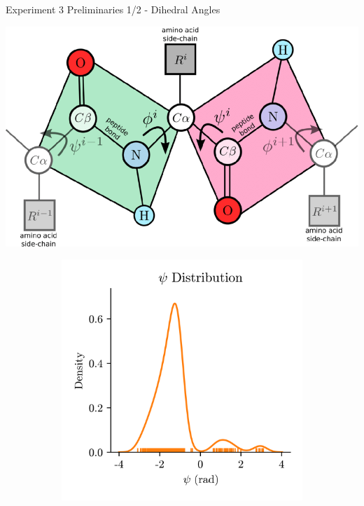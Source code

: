 \documentclass[aspectratio=169, 10pt, dvipsnames]{beamer}
\begin{document}
{
  \begin{frame}[fragile]{Experiment 3 Preliminaries 1/2 - Dihedral Angles}
    \begin{minipage}{0.4\textwidth}
      \centering
      \includegraphics[width=\textwidth]{./figures/phi_psi.png}
    \end{minipage}
    \pause\begin{minipage}{0.3\textwidth}
      \begin{adjustbox}{minipage=\linewidth,scale=0.8}
        \begin{figure}
          \centering
          \begin{subfigure}{\textwidth}
            \includegraphics[width=\textwidth]{./figures/dehedral_dist_psi.png}

\end{subfigure}
\end{figure}
\end{adjustbox}
\end{minipage}
\end{frame}}
\end{document}
